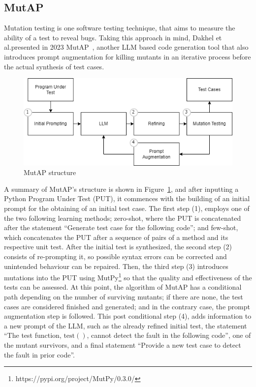 \documentclass[%
  chapterprefix=false,%
  open=right,%
  twoside=true,%
  paper=a4,%
  logofile={Figures/logo.png},%
  thesistype=master,%
  UKenglish,%
]{se2thesis}
\begin{document}
\subsection*{MutAP}

Mutation testing is one software testing technique, that aims to measure the ability of a test to reveal bugs.
Taking this approach in mind, Dakhel et al.\@ presented in 2023 MutAP~\cite{DBLP:journals/corr/abs-2308-16557}, another LLM based code generation tool that also introduces prompt augmentation for killing mutants in an iterative process before the actual synthesis of test cases.

\begin{figure}[tb]
  \centering 
  \includegraphics[width=.99\textwidth]{Figures/mutap.png}
  \caption{MutAP structure}\label{fig:mutap}
\end{figure}

A summary of MutAP's structure is shown in Figure~\ref{fig:mutap}, and after inputting a Python Program Under Test (PUT), it commences with the building of an initial prompt for the obtaining of an initial test case.
The first step (1), employs one of the two following learning methods; zero-shot, where the PUT is concatenated after the statement  ``Generate test case for the following code''; and few-shot, which concatenates the PUT after a sequence of pairs of a method and its respective unit test.
After the initial test is synthesized, the second step (2) consists of re-prompting it, so possible syntax errors can be corrected and unintended behaviour can be repaired.
Then, the third step (3) introduces mutations into the PUT using MutPy\footnote{https://pypi.org/project/MutPy/0.3.0/} so that the quality and effectiveness of the tests can be assessed.
At this point, the algorithm of MutAP has a conditional path depending on the number of surviving mutants; if there are none, the test cases are considered finished and generated; and in the contrary case, the prompt augmentation step is followed.
This post conditional step (4), adds information to a new prompt of the LLM, such as the already refined initial test, the statement ``The test function, \(\text{test}()\), cannot detect the fault in the
following code'', one of the mutant survivors, and a final statement ``Provide a new test case to detect the fault in prior code''.
\end{document}
